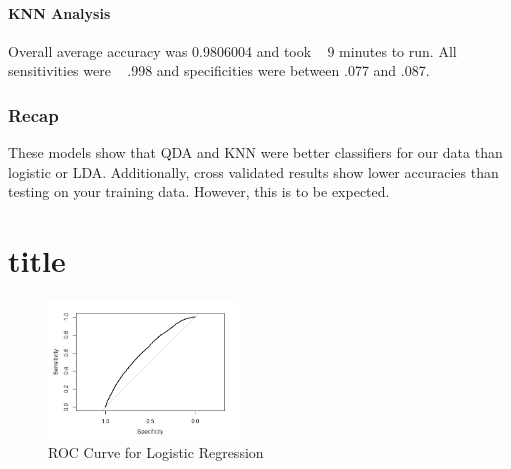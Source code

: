 \documentclass[10pt,twocolumn,letterpaper]{article}
\begin{document}
\subsection{KNN Analysis}
Overall average accuracy was 0.9806004 and took ~ 9 minutes to run. All sensitivities were ~ .998 and specificities were between .077 and .087.


\section{Recap}
These models show that QDA and KNN were better classifiers for our data than logistic or LDA. Additionally, cross validated results show lower accuracies than testing on your training data. However, this is to be expected.
\part{title}

\begin{figure}
	\includegraphics[width=0.45\textwidth]{images/ROC}
	\caption{ROC Curve for Logistic Regression}
	\label{fig:ROC}
\end{figure}
\end{document}
